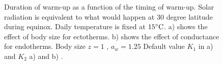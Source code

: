 %
\begin{figure}[H]
\begin{center}
\caption{
	Duration of warm-up as a function of the timing of warm-up.
	Solar radiation is equivalent to what would happen at 30 degree latitude during equinox.
	Daily temperature is fixed at $15^{\circ}\rm{C}$.
	a) shows the effect of body size for ectotherms.
	b)  shows the effect of conductance for endotherms. Body size $z = 1$ , $a_w = 1.25$
	Default value $K_1$ in a) and $K_2$ a) and b) .	
}%
\label{fig5}
\end{center}
\end{figure}
\vspace{-0.8cm}

